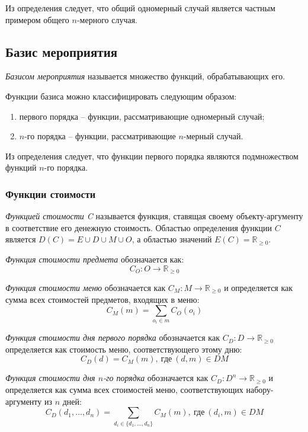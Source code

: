 Из определения следует, что общий одномерный случай является частным примером общего $n$-мерного случая.

\subsection{Базис мероприятия}

\textit{Базисом мероприятия} называется множество функций, обрабатывающих его.

Функции базиса можно классифицировать следующим образом:
\begin{enumerate}
	\item первого порядка -- функции, рассматривающие одномерный случай;
	\item $n$-го порядка -- функции, рассматривающие $n$-мерный случай.
\end{enumerate}

Из определения следует, что функции первого порядка являются подмножеством функций $n$-го порядка.

\subsubsection{Функции стоимости}

\textit{Функцией стоимости C} называется функция, ставящая своему объекту-аргументу в соответствие его денежную стоимость. Областью определения функции $C$ является $D(C) = E \cup D \cup M \cup O$, а областью значений $E(C) = \mathbb{R}_{\ge 0}$.

\textit{Функция стоимости предмета} обозначается как:
\begin{equation}
	C_O: O \rightarrow \mathbb{R}_{\ge 0}
\end{equation}

\textit{Функция стоимости меню} обозначается как $C_M: M \rightarrow \mathbb{R}_{\ge 0}$ и определяется как сумма всех стоимостей предметов, входящих в меню:
\begin{equation}
	C_M(m) = \sum_{o_i \in m} C_O(o_i)
\end{equation}

\textit{Функция стоимости дня первого порядка} обозначается как \newline $C_D: D \rightarrow \mathbb{R}_{\ge 0}$ определяется как стоимость меню, соответствующего этому дню:
\begin{equation}
	C_D(d) = C_M(m), \ \text{где} \ (d, m) \in DM
\end{equation}

\textit{Функция стоимости дня $n$-го порядка} обозначается как $C_D: D^n \rightarrow \mathbb{R}_{\ge 0}$ \newline и определяется как сумма всех стоимостей меню, соответствующих \newline набору-аргументу из $n$ дней:
\begin{equation}
	C_D(d_1, \dots, d_n) = \sum_{d_i \in \{d_1, \dots, d_n\}}{C_M(m)}, \ \text{где} \ (d_i, m) \in DM
\end{equation}

